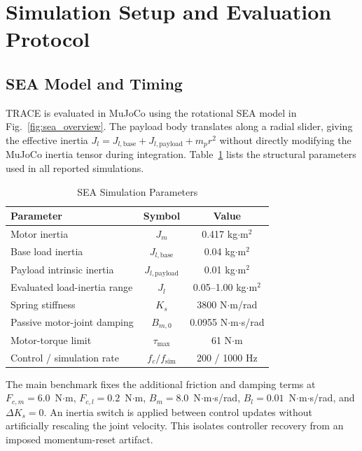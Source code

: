 \section{Simulation Setup and Evaluation Protocol}
\label{sec:simulation_setup}

\subsection{SEA Model and Timing}

TRACE is evaluated in MuJoCo using the rotational SEA model in Fig.~\ref{fig:sea_overview}. The payload body translates along a radial slider, giving the effective inertia $J_l=J_{l,\mathrm{base}}+J_{l,\mathrm{payload}}+m_pr^2$ without directly modifying the MuJoCo inertia tensor during integration. Table~\ref{tab:system_params} lists the structural parameters used in all reported simulations.

\begin{table}[t]
\centering
\caption{SEA Simulation Parameters}
\label{tab:system_params}
\begin{tabular}{@{}lcc@{}}
\toprule
Parameter & Symbol & Value \\
\midrule
Motor inertia & $J_m$ & 0.417 kg$\cdot$m$^2$ \\
Base load inertia & $J_{l,\mathrm{base}}$ & 0.04 kg$\cdot$m$^2$ \\
Payload intrinsic inertia & $J_{l,\mathrm{payload}}$ & 0.01 kg$\cdot$m$^2$ \\
Evaluated load-inertia range & $J_l$ & 0.05--1.00 kg$\cdot$m$^2$ \\
Spring stiffness & $K_s$ & 3800 N$\cdot$m/rad \\
Passive motor-joint damping & $B_{m,0}$ & 0.0955 N$\cdot$m$\cdot$s/rad \\
Motor-torque limit & $\tau_{\max}$ & 61 N$\cdot$m \\
Control / simulation rate & $f_c/f_{\mathrm{sim}}$ & 200 / 1000 Hz \\
\bottomrule
\end{tabular}
\end{table}

The main benchmark fixes the additional friction and damping terms at $F_{c,m}=6.0$~N$\cdot$m, $F_{c,l}=0.2$~N$\cdot$m, $B_m=8.0$~N$\cdot$m$\cdot$s/rad, $B_l=0.01$~N$\cdot$m$\cdot$s/rad, and $\Delta K_s=0$. An inertia switch is applied between control updates without artificially rescaling the joint velocity. This isolates controller recovery from an imposed momentum-reset artifact.

